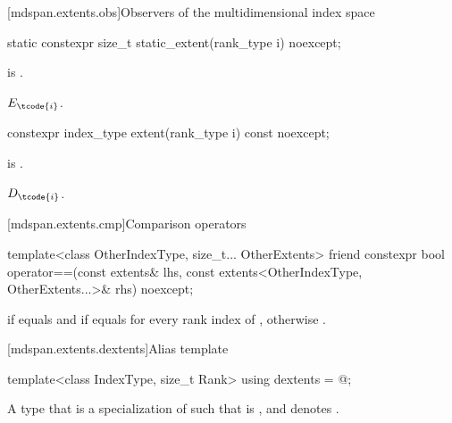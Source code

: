[mdspan.extents.obs]{Observers of the multidimensional index space}

%
\begin{itemdecl}
static constexpr size_t static_extent(rank_type i) noexcept;
\end{itemdecl}

\begin{itemdescr}
\pnum
\expects
{} is .

\pnum
\returns
$E_\tcode{i}$.
\end{itemdescr}

%
\begin{itemdecl}
constexpr index_type extent(rank_type i) const noexcept;
\end{itemdecl}

\begin{itemdescr}
\pnum
\expects
{} is .

\pnum
\returns
$D_\tcode{i}$.
\end{itemdescr}

[mdspan.extents.cmp]{Comparison operators}

%
\begin{itemdecl}
template<class OtherIndexType, size_t... OtherExtents>
  friend constexpr bool operator==(const extents& lhs,
                                   const extents<OtherIndexType, OtherExtents...>& rhs) noexcept;
\end{itemdecl}

\begin{itemdescr}
\pnum
\returns
{} if  equals  and
if  equals 
for every rank index  of ,
otherwise .
\end{itemdescr}

[mdspan.extents.dextents]{Alias template }

%
\begin{itemdecl}
template<class IndexType, size_t Rank>
  using dextents = @\seebelow@;
\end{itemdecl}

\begin{itemdescr}
\pnum
\result
A type  that is a specialization of 
such that  is , and
 denotes .
\end{itemdescr}

